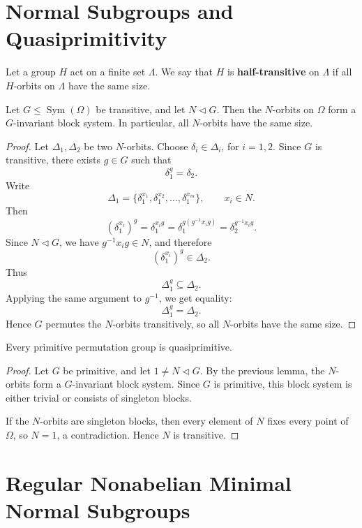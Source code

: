 \section{Normal Subgroups and Quasiprimitivity}

\begin{definition}
Let a group \(H\) act on a finite set \(\Lambda\). We say that \(H\) is
\textbf{half-transitive} on \(\Lambda\) if all \(H\)-orbits on \(\Lambda\) have the
same size.
\end{definition}

\begin{lemma}
Let \(G \leq \operatorname{Sym}(\Omega)\) be transitive, and let \(N \lhd G\).
Then the \(N\)-orbits on \(\Omega\) form a \(G\)-invariant block system. In
particular, all \(N\)-orbits have the same size.
\end{lemma}

\begin{proof}
Let \(\Delta_1,\Delta_2\) be two \(N\)-orbits. Choose
\(\delta_i \in \Delta_i\), for \(i=1,2\). Since \(G\) is transitive, there exists
\(g \in G\) such that
\[
\delta_1^g=\delta_2.
\]
Write
\[
\Delta_1=\{\delta_1^{x_1},\delta_1^{x_2},\ldots,\delta_1^{x_m}\},
\qquad x_i \in N.
\]
Then
\[
(\delta_1^{x_i})^g
=
\delta_1^{x_i g}
=
\delta_1^{g(g^{-1}x_i g)}
=
\delta_2^{g^{-1}x_i g}.
\]
Since \(N \lhd G\), we have \(g^{-1}x_i g \in N\), and therefore
\[
(\delta_1^{x_i})^g \in \Delta_2.
\]
Thus
\[
\Delta_1^g \subseteq \Delta_2.
\]
Applying the same argument to \(g^{-1}\), we get equality:
\[
\Delta_1^g=\Delta_2.
\]
Hence \(G\) permutes the \(N\)-orbits transitively, so all \(N\)-orbits have the
same size.
\end{proof}


\begin{corollary}
Every primitive permutation group is quasiprimitive.
\end{corollary}

\begin{proof}
Let \(G\) be primitive, and let \(1\neq N\lhd G\). By the previous lemma, the
\(N\)-orbits form a \(G\)-invariant block system. Since \(G\) is primitive, this block
system is either trivial or consists of singleton blocks.

If the \(N\)-orbits are singleton blocks, then every element of \(N\) fixes every
point of \(\Omega\), so \(N=1\), a contradiction. Hence \(N\) is transitive.
\end{proof}

\section{Regular Nonabelian Minimal Normal Subgroups}

